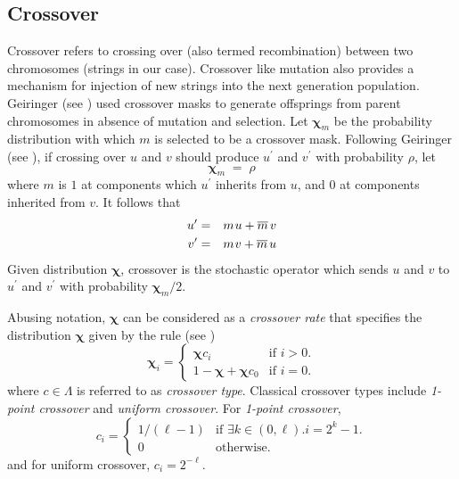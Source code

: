\subsection{Crossover}
Crossover refers to crossing over (also termed recombination) between two chromosomes (strings in our case). 
Crossover like mutation also provides a mechanism for injection of new strings into the next generation population. 
Geiringer (see \cite{Geiringer1944}) used crossover masks to generate offsprings from parent chromosomes 
in absence of mutation and selection. Let $\bm{\chi}_m$ be the probability distribution with which $m$ is 
selected to be a crossover mask. Following Geiringer (see \cite{Geiringer1944}), if crossing over $u$ and $v$ 
should produce $u^\prime$ and $v^\prime$ with probability $\rho$, let
\[
\bm{\chi}_m \; = \; \rho
\]
where $m$ is $1$ at components which $u^\prime$ inherits from $u$, and
$0$ at components inherited from $v$.  It follows that\\[-0.3in]
\begin{eqnarray*}
u^\prime & = & m \nudge u + \overline{m} \nudge\nudge v \\
v^\prime & = & m \nudge v + \overline{m} \nudge\nudge u
\end{eqnarray*}
Given distribution $\bm{\chi}$, crossover is the stochastic operator which
sends $u$ and $v$ to $u^\prime$ and $v^\prime$ with probability $\bm{\chi}_m/2$.

Abusing notation, $\bm{\chi}$ can be considered as a {\em crossover rate} that specifies 
the distribution $\bm{\chi}$ given by the rule (see \cite{VoseWright1998})
\[
  \bm{\chi}_i =\begin{cases}
    \bm{\chi}  c_i & \text{if $i>0$}.\\
    1 - \bm{\chi} + \bm{\chi}  c_0 & \text{if $i = 0$}.
  \end{cases}
\]
where $c \in \Lambda$ is referred to as {\em crossover type}. Classical crossover types 
include {\em 1-point crossover} and {\em uniform crossover}. For {\em 1-point crossover},
\[
  c_i =\begin{cases}
    1/(\ell - 1) & \text{if $\exists k \in (0, \ell).i = 2^k - 1$}.\\
    0 & \text{otherwise}.
  \end{cases}
\]
and for uniform crossover, $c_i = 2^{-\ell}$.


